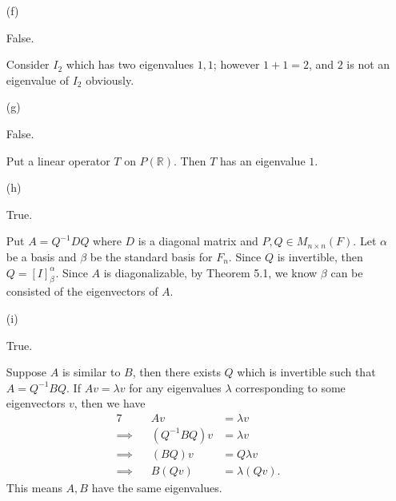 \begin{Exercise}
\begin{enumerate}[(a)]
\item[(f)]
\begin{answer}
False.
\end{answer}
\begin{solution}
Consider $I_2$ which has two eigenvalues $1,1$; however $1+1=2$, and $2$ is not an eigenvalue of $I_2$ obviously.
\end{solution}

\item[(g)]
\begin{answer}
False.
\end{answer}
\begin{solution}
Put a linear operator $T$ on $P(\mathbb{R})$. Then $T$ has an eigenvalue $1$.
\end{solution}

\item[(h)]
\begin{answer}
True.
\end{answer}
\begin{solution}
Put $A = Q^{-1} D Q$ where $D$ is a diagonal matrix and $P,Q\in M_{n\times n}(F)$. Let $\alpha$ be a basis and $\beta$ be the standard basis for $F_n$. Since $Q$ is invertible, then $Q = [I]_{\beta}^{\alpha}$. Since $A$ is diagonalizable, by Theorem 5.1, we know $\beta$ can be consisted of the eigenvectors of $A$.
\end{solution}

\item[(i)]
\begin{answer}
True.
\end{answer}
\begin{solution}
Suppose $A$ is similar to $B$, then there exists $Q$ which is invertible such that $A = Q^{-1} B Q$. If $Av = \lambda v$ for any eigenvalues $\lambda$ corresponding to some eigenvectors $v$, then we have
\begin{alignat*}{7}
\quad&& Av &= \lambda v \\
\implies&& (Q^{-1} B Q ) v &= \lambda v \\
\implies&& (B Q)v &= Q \lambda v \\
\implies&& B(Q v) &= \lambda (Q v).
\end{alignat*}
This means $A,B$ have the same eigenvalues.
\end{solution}


\end{enumerate}
\end{Exercise}
